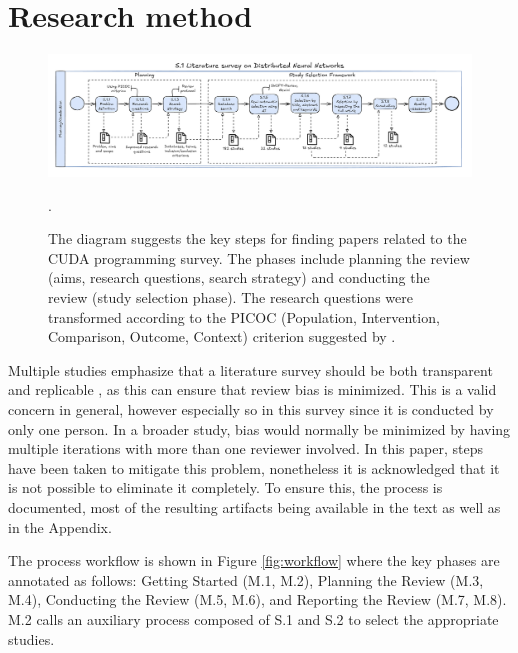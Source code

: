 \section{Research method}
\label{sec:protocol}
\begin{figure}[th]
	\centering
	\includegraphics[width=\linewidth]{figures/survey-dnn.pdf}
	\caption{The diagram suggests the key steps for finding papers related to the CUDA programming survey. The phases
		include planning the review (aims, research questions, search strategy) and conducting the review (study selection phase). The research questions
		were transformed according to the PICOC (Population, Intervention, Comparison, Outcome, Context) criterion suggested by \cite{keele_systematic_2007}.}.
	\label{fig:workflow-study-cuda}
\end{figure}

Multiple studies emphasize that a literature survey should be both transparent and replicable
\cite{keele_systematic_2007, dos_santos_sustainable_2024-1}, as this can ensure that review bias is
minimized. This is a valid concern in general, however especially so in this survey since it is
conducted by only one person. In a broader study, bias would normally be minimized by having
multiple iterations with more than one reviewer involved. In this paper, steps have been taken to
mitigate this problem, nonetheless it is acknowledged that it is not possible to eliminate it
completely. To ensure this, the process is documented, most of the resulting artifacts being
available in the text as well as in the Appendix.


The process workflow is shown in Figure \ref{fig:workflow} where the key phases are annotated as
follows: Getting Started (M.1, M.2), Planning the Review (M.3, M.4), Conducting the Review (M.5,
M.6), and Reporting the Review (M.7, M.8). M.2 calls an auxiliary process composed of S.1 and S.2
to select the appropriate studies.


